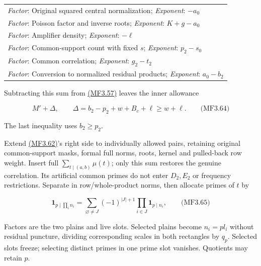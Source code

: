 \begingroup\small
\begin{longtable}{@{}p{\linewidth}@{}}
\toprule
\endhead
\bottomrule
\endlastfoot
\textit{Factor}: Original squared central normalization; \enspace \textit{Exponent}: \(-a_0\) \\
\addlinespace[3pt]
\textit{Factor}: Poisson factor and inverse roots; \enspace \textit{Exponent}: \(K+g-a_0\) \\
\addlinespace[3pt]
\textit{Factor}: Amplifier density; \enspace \textit{Exponent}: \(-\ell\) \\
\addlinespace[3pt]
\textit{Factor}: Common-support count with fixed \(s\); \enspace \textit{Exponent}: \(p_2-s_0\) \\
\addlinespace[3pt]
\textit{Factor}: Common correlation; \enspace \textit{Exponent}: \(g_2-t_2\) \\
\addlinespace[3pt]
\textit{Factor}: Conversion to normalized residual products; \enspace \textit{Exponent}: \(a_0-b_2\) \\
\end{longtable}
\endgroup

Subtracting this sum from \protect\hyperlink{mf:eq:B3.57}{(MF3.57)} leaves the inner allowance

\hypertarget{mf:eq:B3.64}{}

\label{mf:eq:B3.64}

\[
M'+\Delta,\qquad \Delta=b_2-p_2+w+B_c+\ell\ge w+\ell.
\qquad\text{(MF3.64)}
\]

The last inequality uses \(b_2\ge p_2\).

Extend \protect\hyperlink{mf:eq:B3.62}{(MF3.62)}'s right side to individually allowed pairs, retaining original common-support masks, formal full norms, roots, kernel and pulled-back row weight. Insert full \(\sum_{t\mid(a,b)}\mu(t)\); only this sum restores the genuine correlation. Its artificial common primes do not enter \(D_2,E_2\) or frequency restrictions. Separate in row/whole-product norms, then allocate primes of \(t\) by

\hypertarget{mf:eq:B3.65}{}

\label{mf:eq:B3.65}

\[
\mathbf1_{p\mid\prod_i n_i}
=\sum_{\varnothing\ne J}(-1)^{|J|+1}\prod_{i\in J}\mathbf1_{p\mid n_i},
\qquad\text{(MF3.65)}
\]

Factors are the two plains and live slots. Selected plains become \(n_i=pl_i\) without residual puncture, dividing corresponding scales in both rectangles by \(q_p\). Selected slots freeze; selecting distinct primes in one prime slot vanishes. Quotients may retain \(p\).

